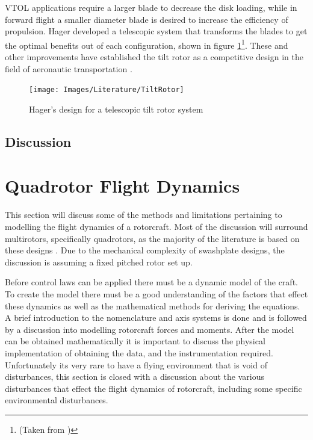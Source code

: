 VTOL applications require a larger blade to decrease the disk loading, while in forward flight a smaller diameter blade is desired to increase the efficiency of propulsion. Hager \cite{US6030177} developed a telescopic system that transforms the blades to get the optimal benefits out of each configuration, shown in figure \ref{IM_TiltRotor}\footnote{(Taken from \cite{Heli})}. These and other improvements have established the tilt rotor as a competitive design in the field of aeronautic transportation \cite{RotorConfig}.

\begin{figure}[H]
	\centering
	\texttt{[image: Images/Literature/TiltRotor]}     
	\caption{Hager's design for a telescopic tilt rotor system \cite{Heli}}
	\label{IM_TiltRotor}
\end{figure}

\subsection{Discussion}


\section{Quadrotor Flight Dynamics}

This section will discuss some of the methods and limitations pertaining to modelling the flight dynamics of a rotorcraft. Most of the discussion will surround multirotors, specifically quadrotors, as the majority of the literature is based on these designs \cite{Luukkonen, RealTime, Pounds2006, Hoffmann, Moller2015}. Due to the mechanical complexity of swashplate designs, the discussion is assuming a fixed pitched rotor set up. 

Before control laws can be applied there must be a dynamic model of the craft. To create the model there must be a good understanding of the factors that effect these dynamics as well as the mathematical methods for deriving the equations. A brief introduction to the nomenclature and axis systems is done and is followed by a discussion into modelling rotorcraft forces and moments. After the model can be obtained mathematically it is important to discuss the physical implementation of obtaining the data, and the instrumentation required. Unfortunately its very rare to have a flying environment that is void of disturbances, this section is closed with a discussion about the various disturbances that effect the flight dynamics of rotorcraft, including some specific environmental disturbances.

